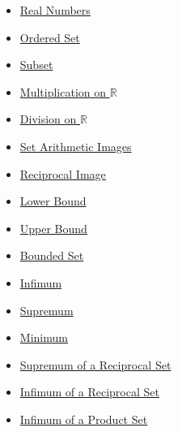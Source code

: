 \begin{dependencies}
\begin{itemize}
  \item \hyperref[def:reals]{Real Numbers}
  \item \hyperref[def:ordered-set]{Ordered Set}
  \item \hyperref[def:subset]{Subset}
  \item \hyperref[def:multiplication-on-r]{Multiplication on $\mathbb{R}$}
  \item \hyperref[def:division-on-r]{Division on $\mathbb{R}$}
  \item \hyperref[def:set-arithmetic-images]{Set Arithmetic Images}
  \item \hyperref[def:reciprocal-image]{Reciprocal Image}
  \item \hyperref[def:real-lower-bound]{Lower Bound}
  \item \hyperref[def:real-upper-bound]{Upper Bound}
  \item \hyperref[def:bounded]{Bounded Set}
  \item \hyperref[def:infimum]{Infimum}
  \item \hyperref[def:supremum]{Supremum}
  \item \hyperref[def:minimum]{Minimum}
  \item \hyperref[thm:supremum-reciprocal-set]{Supremum of a Reciprocal Set}
  \item \hyperref[thm:infimum-reciprocal-set]{Infimum of a Reciprocal Set}
  \item \hyperref[thm:infimum-product-set]{Infimum of a Product Set}
\end{itemize}
\end{dependencies}

